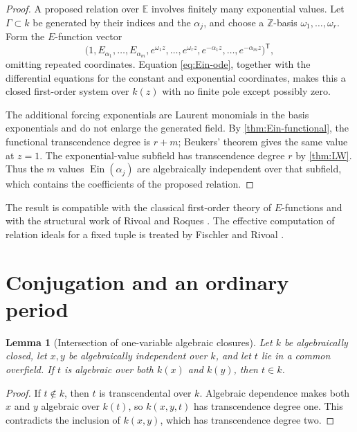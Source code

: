 \documentclass[11pt]{article}
\numberwithin{equation}{section}
\newtheorem{lemma}[lemma]{Lemma}
\theoremstyle{definition}
\theoremstyle{remark}
\newcommand{\Ein}{\operatorname{Ein}}
\begin{document}
\begin{proof}
A proposed relation over $\mathbb E$ involves finitely many exponential
values.  Let $\Gamma\subset k$ be generated by their indices and the
$\alpha_j$, and choose a $\mathbb Z$-basis
$\omega_1,\ldots,\omega_r$.  Form the $E$-function vector
\[
  \bigl(1,E_{\alpha_1},\ldots,E_{\alpha_m},
        e^{\omega_1z},\ldots,e^{\omega_rz},
        e^{-\alpha_1z},\ldots,e^{-\alpha_mz}\bigr)^{\mathsf T},
\]
omitting repeated coordinates.  Equation \eqref{eq:Ein-ode}, together
with the differential equations for the constant and exponential
coordinates, makes this a closed first-order system over $k(z)$ with no
finite pole except possibly zero.

The additional forcing exponentials are Laurent monomials in the basis
exponentials and do not enlarge the generated field.  By
\cref{thm:Ein-functional}, the functional transcendence degree is $r+m$;
Beukers' theorem gives the same value at $z=1$.  The exponential-value
subfield has transcendence degree $r$ by \cref{thm:LW}.  Thus the $m$
values $\Ein(\alpha_j)$ are algebraically independent over that subfield,
which contains the coefficients of the proposed relation.
\end{proof}

The result is compatible with the classical first-order theory of
$E$-functions \cite{Salikhov} and with the structural work of Rivoal and
Roques \cite{RivoalRoques}.  The effective computation of relation ideals for
a fixed tuple is treated by Fischler and Rivoal
\cite{FischlerRivoalEffective}.

\section{Conjugation and an ordinary period}

\begin{lemma}[Intersection of one-variable algebraic closures]
\label{lem:field-intersection}
Let $k$ be algebraically closed, let $x,y$ be algebraically independent over
$k$, and let $t$ lie in a common overfield.  If $t$ is algebraic over both
$k(x)$ and $k(y)$, then $t\in k$.
\end{lemma}

\begin{proof}
If $t\notin k$, then $t$ is transcendental over $k$.  Algebraic dependence
makes both $x$ and $y$ algebraic over $k(t)$, so $k(x,y,t)$ has
transcendence degree one.  This contradicts the inclusion of $k(x,y)$, which
has transcendence degree two.
\end{proof}
\end{document}

